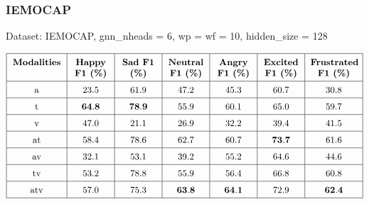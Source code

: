 \documentclass[a4paper]{article}
\begin{document}
\subsubsection{IEMOCAP}
Dataset: IEMOCAP, gnn\_nheads = 6, wp = wf = 10, hidden\_size = 128

\[
\renewcommand{\arraystretch}{1.5}
\begin{tabular}{|p{1.9cm}<{\centering}|p{1.4cm}<{\centering}|p{1.4cm}<{\centering}|p{1.4cm}<{\centering}|p{1.4cm}<{\centering}|p{1.4cm}<{\centering}|p{1.8cm}<{\centering}|}
    \hline
    \textbf{Modalities} & \textbf{Happy F1 (\%)} & \textbf{Sad F1 (\%)} & \textbf{Neutral F1 (\%)} & \textbf{Angry F1 (\%)} & \textbf{Excited F1 (\%)} & \textbf{Frustrated F1 (\%)} \\
    \hline
    \text{a} & 23.5 & 61.9 & 47.2 & 45.3 & 60.7 & 30.8 \\
    \hline
    \text{t} & \(\mathbf{64.8}\) & \(\mathbf{78.9}\) & 55.9 & 60.1 & 65.0 & 59.7 \\
    \hline
    \text{v} & 47.0 & 21.1 & 26.9 & 32.2 & 39.4 & 41.5 \\
    \hline
    \text{at} & 58.4 & 78.6 & 62.7 & 60.7 & \(\mathbf{73.7}\) & 61.6 \\
    \hline
    \text{av} & 32.1 & 53.1 & 39.2 & 55.2 & 64.6 & 44.6 \\
    \hline
    \text{tv} & 53.2 & 78.8 & 55.9 & 56.4 & 66.8 & 60.8 \\
    \hline
    \text{atv} & 57.0 & 75.3 & \(\mathbf{63.8}\) & \(\mathbf{64.1}\) & 72.9 & \(\mathbf{62.4}\) \\
    \hline 
\end{tabular}
\]
\end{document}
